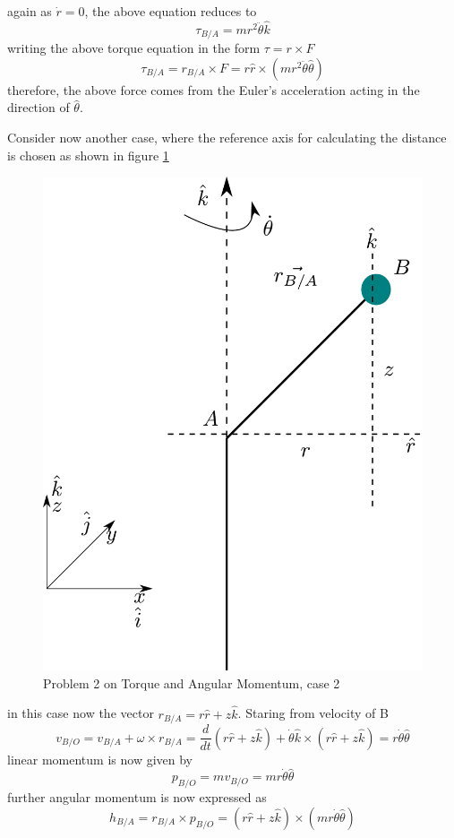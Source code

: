 again as $\dot{r} = 0$, the above equation reduces to
\begin{equation}
	\tau_{B/A} = m r^{2}\ddot{\theta} \hat{k}
\end{equation}
writing the above torque equation in the form $\tau = r \times F$
\begin{equation}
	\tau_{B/A} = r_{B/A} \times F = r \hat{r} \times \left( m r^{2}\ddot{\theta} \hat{\theta} \right)
\end{equation}
therefore, the above force comes from the Euler's acceleration acting in the direction of $\hat{\theta}$.

Consider now another case, where the reference axis for calculating the distance is chosen as shown in figure \ref{fig_0_ch_2_Problem2_case2}
\newpage
\begin{figure}[h!]
	\centering
	\includegraphics[width=0.5\linewidth]{Bilder/052_vel_acc_polar_coordinates.pdf}
		\caption{Problem 2 on Torque and Angular Momentum, case 2}
	\label{fig_0_ch_2_Problem2_case2}
\end{figure}
in this case now the vector $r_{B/A} = r \hat{r} + z \hat{k}$. Staring from velocity of B
\begin{equation}
v_{B/O} = v_{B/A} + \omega \times r_{B/A} = \frac{d}{dt}\left( r \hat{r} + z \hat{k} \right) + \dot{\theta} \hat{k} \times \left( r \hat{r} + z \hat{k} \right) = r \dot{\theta} \hat{\theta}
\end{equation}
linear momentum is now given by
\begin{equation}
	p_{B/O} = m v_{B/O} = m r \dot{\theta} \hat{\theta}
\end{equation}
further angular momentum is now expressed as
\begin{equation}
	h_{B/A} = r_{B/A} \times p_{B/O} =  \left(r \hat{r} + z \hat{k} \right) \times \left( m r \dot{\theta} \hat{\theta} \right)
\end{equation}
